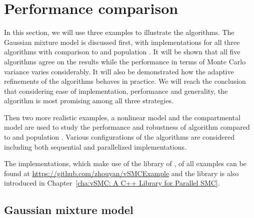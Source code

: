 \section{Performance comparison}
\label{sec:Performance comparison}

In this section, we will use three examples to illustrate the algorithms. The
Gaussian mixture model is discussed first, with implementations for all three
\smc algorithms with comparison to \rjmcmc and population \mcmc. It will be
shown that all five algorithms agree on the results while the performance in
terms of Monte Carlo variance varies considerably. It will also be
demonstrated how the adaptive refinements of the algorithms behaves in
practice. We will reach the conclusion that considering ease of
implementation, performance and generality, the \smc[2] algorithm is most
promising among all three strategies.

Then two more realistic examples, a nonlinear \ode model and the \pet
compartmental model are used to study the performance and robustness of
algorithm \smc[2] compared to \ais and population \mcmc. Various
configurations of the algorithms are considered including both sequential and
parallelized implementations.

The \cpp implementations, which make use of the \vsmc library of
\cite{vsmcjss}, of all examples can be found at
\url{https://github.com/zhouyan/vSMCExample} and the library is also
introduced in Chapter~\ref{cha:vSMC: A C++ Library for Parallel SMC}.

\subsection{Gaussian mixture model}
\label{sub:Gaussian mixture model}

